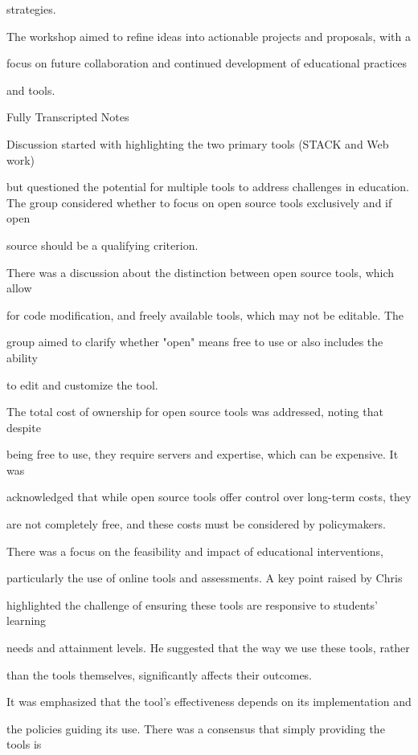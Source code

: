 \documentclass[11pt]{article}
\begin{document}
strategies.

The workshop aimed to refine ideas into actionable projects and proposals, with a

focus on future collaboration and continued development of educational practices

and tools.

Fully Transcripted Notes

Discussion started with highlighting the two primary tools (STACK and Web work)

but questioned the potential for multiple tools to address challenges in education. The group considered whether to focus on open source tools exclusively and if open

source should be a qualifying criterion.

There was a discussion about the distinction between open source tools, which allow

for code modification, and freely available tools, which may not be editable. The

group aimed to clarify whether "open" means free to use or also includes the ability

to edit and customize the tool.

The total cost of ownership for open source tools was addressed, noting that despite

being free to use, they require servers and expertise, which can be expensive. It was

acknowledged that while open source tools offer control over long-term costs, they

are not completely free, and these costs must be considered by policymakers.

There was a focus on the feasibility and impact of educational interventions,

particularly the use of online tools and assessments. A key point raised by Chris

highlighted the challenge of ensuring these tools are responsive to students' learning

needs and attainment levels. He suggested that the way we use these tools, rather

than the tools themselves, significantly affects their outcomes.

It was emphasized that the tool's effectiveness depends on its implementation and

the policies guiding its use. There was a consensus that simply providing the tools is
\end{document}
